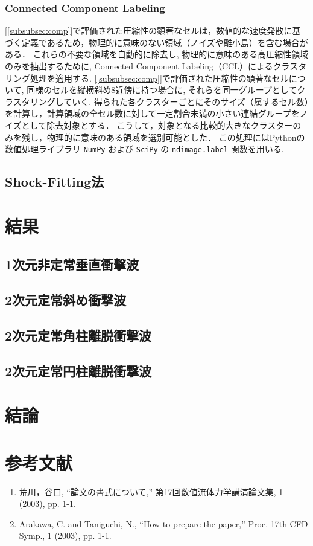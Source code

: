 \documentclass[a4j]{jarticle}
\begin{document}
\subsubsection{Connected Component Labeling}\label{subsubsec:CCL}
[\ref{subsubsec:comp}]で評価された圧縮性の顕著なセルは，数値的な速度発散に基づく定義であるため，物理的に意味のない領域（ノイズや離小島）を含む場合がある．
これらの不要な領域を自動的に除去し, 物理的に意味のある高圧縮性領域のみを抽出するために, Connected Component Labeling（CCL）によるクラスタリング処理を適用する.
[\ref{subsubsec:comp}]で評価された圧縮性の顕著なセルについて, 同様のセルを縦横斜め8近傍に持つ場合に, それらを同一グループとしてクラスタリングしていく.
得られた各クラスターごとにそのサイズ（属するセル数）を計算し，計算領域の全セル数に対して一定割合未満の小さい連結グループをノイズとして除去対象とする．
こうして，対象となる比較的大きなクラスターのみを残し，物理的に意味のある領域を選別可能とした．
この処理にはPythonの数値処理ライブラリ \texttt{NumPy} および \texttt{SciPy} の \texttt{ndimage.label} 関数を用いる.

\subsection{Shock-Fitting法}


\section{結果}
\subsection{1次元非定常垂直衝撃波}

\subsection{2次元定常斜め衝撃波}

\subsection{2次元定常角柱離脱衝撃波}

\subsection{2次元定常円柱離脱衝撃波}

\section{結論}

\section*{参考文献}

\begin{enumerate}
    \item 荒川，谷口, ``論文の書式について,'' 第17回数値流体力学講演論文集, 1 (2003), pp. 1-1.
    \item Arakawa, C. and Taniguchi, N., ``How to prepare the paper,'' Proc. 17th CFD Symp., 1 (2003), pp. 1-1.
\end{enumerate}
\end{document}
